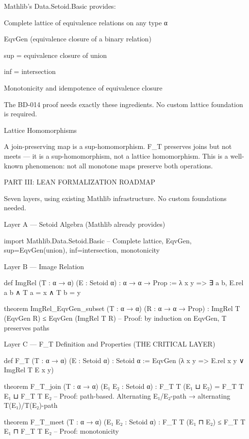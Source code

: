Mathlib's Data.Setoid.Basic provides:




Complete lattice of equivalence relations on any type α


EqvGen (equivalence closure of a binary relation)


sup = equivalence closure of union


inf = intersection


Monotonicity and idempotence of equivalence closure




The BD-014 proof needs exactly these ingredients. No custom lattice foundation is required.




Lattice Homomorphisms




A join-preserving map is a sup-homomorphism. F_T preserves joins but not meets — it is a sup-homomorphism, not a lattice homomorphism. This is a well-known phenomenon: not all monotone maps preserve both operations.



PART III: LEAN FORMALIZATION ROADMAP


Seven layers, using existing Mathlib infrastructure. No custom foundations needed.


Layer A — Setoid Algebra (Mathlib already provides)


import Mathlib.Data.Setoid.Basic  
-- Complete lattice, EqvGen, sup=EqvGen(union), inf=intersection, monotonicity  



Layer B — Image Relation


def ImgRel (T : α → α) (E : Setoid α) : α → α → Prop :=  
  λ x y => ∃ a b, E.rel a b ∧ T a = x ∧ T b = y  
  
theorem ImgRel_EqvGen_subset (T : α → α) (R : α → α → Prop) :  
  ImgRel T (EqvGen R) ≤ EqvGen (ImgRel T R)  
-- Proof: by induction on EqvGen, T preserves paths  



Layer C — F_T Definition and Properties (THE CRITICAL LAYER)


def F_T (T : α → α) (E : Setoid α) : Setoid α :=  
  EqvGen (λ x y => E.rel x y ∨ ImgRel T E x y)  
  
theorem F_T_join (T : α → α) (E₁ E₂ : Setoid α) :  
  F_T T (E₁ ⊔ E₂) = F_T T E₁ ⊔ F_T T E₂  
-- Proof: path-based. Alternating E₁/E₂-path → alternating T(E₁)/T(E₂)-path  
  
theorem F_T_meet (T : α → α) (E₁ E₂ : Setoid α) :  
  F_T T (E₁ ⊓ E₂) ≤ F_T T E₁ ⊓ F_T T E₂  
-- Proof: monotonicity  



